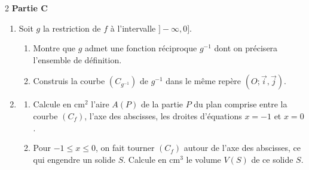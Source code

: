 \documentclass[12pt,a4paper]{article}
\begin{document}
\begin{multicols}{2}
\textbf{Partie C}

\begin{enumerate}
\item Soit $g$ la restriction de $f$ à l’intervalle $]-\infty,0]$.
\begin{enumerate}
\item Montre que $g$ admet une fonction réciproque $g^{-1}$ dont on précisera l’ensemble de définition.
\item Construis la courbe $(C_{g^{-1}})$ de $g^{-1}$ dans le même repère $(O;\vec{i},\vec{j})$.
\end{enumerate}

\item
\begin{enumerate}
\item Calcule en cm$^2$ l’aire $A(P)$ de la partie $P$ du plan comprise entre la courbe $(C_f)$, l’axe des abscisses, les droites d’équations $x=-1$ et $x=0$.
\item Pour $-1\leq x\leq 0$, on fait tourner $(C_f)$ autour de l’axe des abscisses, ce qui engendre un solide $S$.  
Calcule en cm$^3$ le volume $V(S)$ de ce solide $S$.
\end{enumerate}
\end{enumerate}

\end{multicols}
\end{document}
